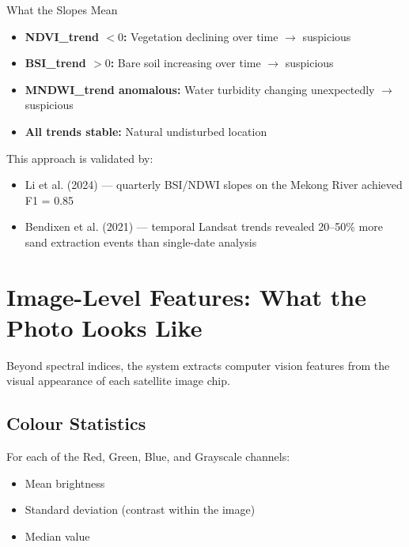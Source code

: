\documentclass[12pt, a4paper]{article}
\begin{document}
\begin{keybox}{What the Slopes Mean}
  \begin{itemize}[noitemsep]
    \item \textbf{NDVI\_trend $< 0$:} Vegetation declining over time
          $\rightarrow$ suspicious
    \item \textbf{BSI\_trend $> 0$:} Bare soil increasing over time
          $\rightarrow$ suspicious
    \item \textbf{MNDWI\_trend anomalous:} Water turbidity changing
          unexpectedly $\rightarrow$ suspicious
    \item \textbf{All trends stable:} Natural undisturbed location
  \end{itemize}
\end{keybox}

This approach is validated by:
\begin{itemize}[noitemsep]
  \item Li et al. (2024) --- quarterly BSI/NDWI slopes on the Mekong
        River achieved F1 = 0.85
  \item Bendixen et al. (2021) --- temporal Landsat trends revealed
        20--50\% more sand extraction events than single-date analysis
\end{itemize}

\section{Image-Level Features: What the Photo Looks Like}

Beyond spectral indices, the system extracts computer vision features
from the visual appearance of each satellite image chip.

\subsection{Colour Statistics}

For each of the Red, Green, Blue, and Grayscale channels:
\begin{itemize}[noitemsep]
  \item Mean brightness
  \item Standard deviation (contrast within the image)
  \item Median value
\end{itemize}
\end{document}
